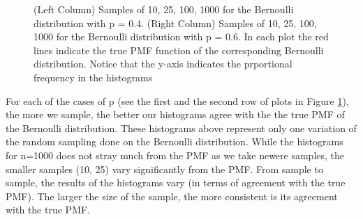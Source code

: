 \documentclass{article}\usepackage[]{graphicx}\usepackage[]{color}
\begin{document}
\begin{enumerate}
\begin{enumerate}
\begin{figure}[H]
\begin{center}
    \caption{(Left Column) Samples of 10, 25, 100, 1000 for the Bernoulli distribution with p = 0.4. (Right Column) Samples of 10, 25, 100, 1000 for the Bernoulli distribution with p = 0.6. In each plot the red lines indicate the true PMF function of the corresponding Bernoulli distribution. Notice that the y-axis indicates the prportional frequency in the histograms}
    \label{P3fig_3} %
  \end{center}
\end{figure}
	\end{enumerate}
	For each of the cases of p (see the first and the second row of plots in Figure \ref{P3fig_3}), the more we sample, the better our histograms agree with the the true PMF of the Bernoulli distribution. These histograms above represent only one variation of the random sampling done on the Bernoulli distribution. While the histograms for n=1000 does not stray much from the PMF as we take newere samples, the smaller samples (10, 25) vary significantly from the PMF. From sample to sample, the results of the histograms vary (in terms of agreement with the true PMF). The larger the size of the sample, the more consistent is its agreement with the true PMF. 
	

\end{enumerate}
\end{document}
